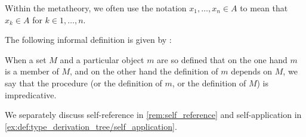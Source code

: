 \begin{remark}\label{rem:multiple_set_membership_shorthand}
  Within the metatheory, we often use the notation \( x_1, \ldots, x_n \in A \) to mean that \( x_k \in A \) for \( k \in 1, \ldots, n \).
\end{remark}

\begin{concept}\label{con:impredicativity}
  The following informal definition is given by :
  \begin{displayquote}
    When a set \( M \) and a particular object \( m \) are so defined that on the one hand \( m \) is a member of \( M \), and on the other hand the definition of \( m \) depends on \( M \), we say that the procedure (or the definition of \( m \), or the definition of \( M \)) is impredicative.
  \end{displayquote}
\end{concept}
\begin{comments}
  \item We separately discuss self-reference in \cref{rem:self_reference} and self-application in \cref{ex:def:type_derivation_tree/self_application}.
\end{comments}

